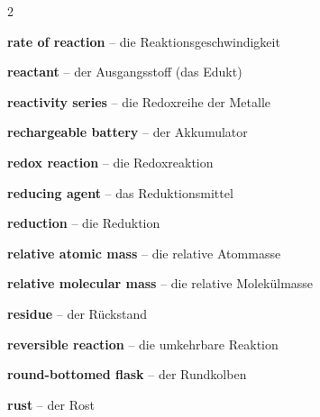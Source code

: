 \begin{multicols}{2}
\par\nopagebreak
\textbf{rate of reaction} -- die Reaktionsgeschwindigkeit\dotfill\hyperref[e:143]{\pageref*{e:143}}\par
\textbf{reactant} -- der Ausgangsstoff (das Edukt)\dotfill\hyperref[e:126]{\pageref*{e:126}}\par
\textbf{reactivity series} -- die Redoxreihe der Metalle\dotfill\hyperref[e:194]{\pageref*{e:194}}\par
\textbf{rechargeable battery} -- der Akkumulator\dotfill\hyperref[e:204]{\pageref*{e:204}}\par
\textbf{redox reaction} -- die Redoxreaktion\dotfill\hyperref[e:185]{\pageref*{e:185}}\par
\textbf{reducing agent} -- das Reduktionsmittel\dotfill\hyperref[e:187]{\pageref*{e:187}}\par
\textbf{reduction} -- die Reduktion\dotfill\hyperref[e:184]{\pageref*{e:184}}\par
\textbf{relative atomic mass} -- die relative Atommasse\dotfill\hyperref[e:82]{\pageref*{e:82}}\par
\textbf{relative molecular mass} -- die relative Molekülmasse\dotfill\hyperref[e:254]{\pageref*{e:254}}\par
\textbf{residue} -- der Rückstand\dotfill\hyperref[e:33]{\pageref*{e:33}}\par
\textbf{reversible reaction} -- die umkehrbare Reaktion\dotfill\hyperref[e:144]{\pageref*{e:144}}\par
\textbf{round-bottomed flask} -- der Rundkolben\dotfill\hyperref[e:42]{\pageref*{e:42}}\par
\textbf{rust} -- der Rost\dotfill\hyperref[e:191]{\pageref*{e:191}}\par


\end{multicols}
